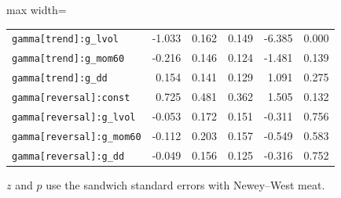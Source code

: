 \begin{table}[!htbp]
\begin{adjustbox}{max width=\textwidth}
\begin{tabular}{lrrrrr}
\texttt{gamma[trend]:g\_lvol} & -1.033 & 0.162 & 0.149 & -6.385 & 0.000\\
\texttt{gamma[trend]:g\_mom60} & -0.216 & 0.146 & 0.124 & -1.481 & 0.139\\
\texttt{gamma[trend]:g\_dd} & 0.154 & 0.141 & 0.129 & 1.091 & 0.275\\
\texttt{gamma[reversal]:const} & 0.725 & 0.481 & 0.362 & 1.505 & 0.132\\
\texttt{gamma[reversal]:g\_lvol} & -0.053 & 0.172 & 0.151 & -0.311 & 0.756\\
\texttt{gamma[reversal]:g\_mom60} & -0.112 & 0.203 & 0.157 & -0.549 & 0.583\\
\texttt{gamma[reversal]:g\_dd} & -0.049 & 0.156 & 0.125 & -0.316 & 0.752\\
\bottomrule
\end{tabular}
\end{adjustbox}
\par\smallskip\begin{minipage}{\textwidth}\footnotesize
$z$ and $p$ use the sandwich standard errors with Newey--West meat.
\end{minipage}
\end{table}